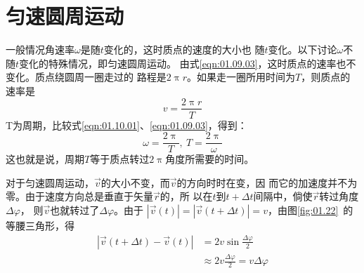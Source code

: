 \section{匀速圆周运动}\label{sec:01.10}

一般情况角速率$\omega$是随$t$变化的，这时质点的速度的大小也
随$t$变化。以下讨论$\omega$不随$t$变化的特殊情况，即匀速圆周运动。
由式\eqref{eqn:01.09.03}，这时质点的速率也不变化。质点绕圆周一圈走过的
路程是$2\uppi r$。如果走一圈所用时间为$T$，则质点的速率是
\begin{equation}\label{eqn:01.10.01}
  v=\frac{2 \uppi r}{T}
\end{equation}
T为周期，比较式\eqref{eqn:01.10.01}、\eqref{eqn:01.09.03}，得到：
\begin{equation}\label{eqn:01.10.02}
  \omega=\frac{2 \uppi}{T}, ~ T=\frac{2 \uppi}{\omega}
\end{equation}
这也就是说，周期$T$等于质点转过$2\uppi$角度所需要的时间。

对于匀速圆周运动，$\vec{v}$的大小不变，而$\vec{v}$的方向时时在变，因
而它的加速度并不为零。由于速度方向总是垂直于矢量$\vec{r}$的，所
以在$t$到$t+\Delta t$间隔中，倘使$\vec{r}$转过角度$\Delta\varphi$，
则$\vec{v}$也就转过了$\Delta\varphi$。由于
$|\vec{v}\left(t\right)|=|\vec{v}\left(t+\Delta t\right)|=v$，由图\ref{fig:01.22}~的等腰三角形，得
\begin{equation*}
  \begin{aligned}
    |\vec{v}\left(t+\Delta t\right)-\vec{v}\left(t\right)| & =2 v \sin \frac{\Delta \varphi}{2}                   \\
                                                           & \approx 2 v\frac{\Delta \varphi}{2}=v \Delta \varphi
  \end{aligned}
\end{equation*}

